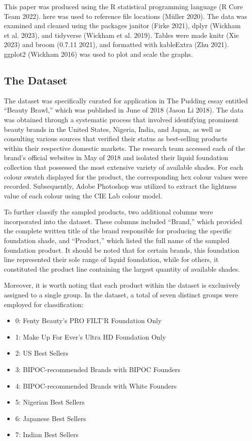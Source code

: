 \documentclass[
  letterpaper,
  DIV=11,
  numbers=noendperiod]{scrartcl}
\providecommand{\tightlist}{%
  \setlength{\itemsep}{0pt}\setlength{\parskip}{0pt}}\usepackage{longtable,booktabs,array}
\begin{document}
This paper was produced using the R statistical programming language (R
Core Team 2022). here was used to reference file locations (Müller
2020). The data was examined and cleaned using the packages janitor
(Firke 2021), dplyr (Wickham et al. 2023), and tidyverse (Wickham et al.
2019). Tables were made knitr (Xie 2023) and broom (0.7.11 2021), and
formatted with kableExtra (Zhu 2021). ggplot2 (Wickham 2016) was used to
plot and scale the graphs.

\hypertarget{the-dataset}{%
\subsection{The Dataset}\label{the-dataset}}

The dataset was specifically curated for application in The Pudding
essay entitled ``Beauty Brawl,'' which was published in June of 2018
(Jason Li 2018). The data was obtained through a systematic process that
involved identifying prominent beauty brands in the United States,
Nigeria, India, and Japan, as well as consulting various sources that
verified their status as best-selling products within their respective
domestic markets. The research team accessed each of the brand's
official websites in May of 2018 and isolated their liquid foundation
collection that possessed the most extensive variety of available
shades. For each colour swatch displayed for the product, the
corresponding hex colour values were recorded. Subsequently, Adobe
Photoshop was utilized to extract the lightness value of each colour
using the CIE Lab colour model.

To further classify the sampled products, two additional columns were
incorporated into the dataset. These columns included ``Brand,'' which
provided the complete written title of the brand responsible for
producing the specific foundation shade, and ``Product,'' which listed
the full name of the sampled foundation product. It should be noted that
for certain brands, this foundation line represented their sole range of
liquid foundation, while for others, it constituted the product line
containing the largest quantity of available shades.

Moreover, it is worth noting that each product within the dataset is
exclusively assigned to a single group. In the dataset, a total of seven
distinct groups were employed for classification:

\begin{itemize}
\tightlist
\item
  0: Fenty Beauty's PRO FILT'R Foundation Only
\item
  1: Make Up For Ever's Ultra HD Foundation Only
\item
  2: US Best Sellers
\item
  3: BIPOC-recommended Brands with BIPOC Founders
\item
  4: BIPOC-recommended Brands with White Founders
\item
  5: Nigerian Best Sellers
\item
  6: Japanese Best Sellers
\item
  7: Indian Best Sellers
\end{itemize}
\end{document}
